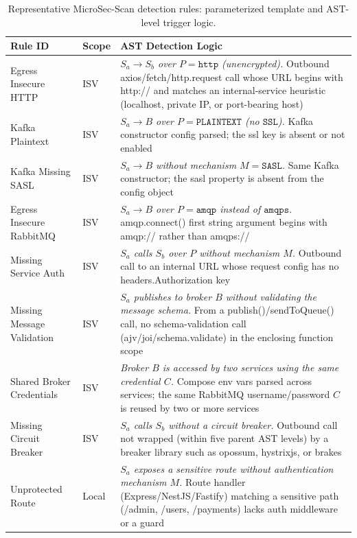 \documentclass[preprint,12pt]{elsarticle}
\begin{document}
\begin{table}[!t]
\centering
\caption{Representative MicroSec-Scan detection rules: parameterized template and AST-level trigger logic.}
\label{tab:rule_examples}
\setlength{\tabcolsep}{4pt}
\renewcommand{\arraystretch}{1.1}
\scriptsize
\begin{tabularx}{\linewidth}{@{} L{2.3cm} C{0.7cm} Y @{}}
\toprule
\textbf{Rule ID} & \textbf{Scope} & \textbf{AST Detection Logic} \\
\midrule
Egress Insecure HTTP & ISV &
\textit{$S_a \rightarrow S_b$ over $P=\mathtt{http}$ (unencrypted).} Outbound axios/fetch/http.request call whose URL begins with http:// and matches an internal-service heuristic (localhost, private IP, or port-bearing host) \\
\addlinespace[2pt]
Kafka Plaintext & ISV &
\textit{$S_a \rightarrow B$ over $P=\mathtt{PLAINTEXT}$ (no $\mathtt{SSL}$).} Kafka constructor config parsed; the ssl key is absent or not enabled \\
\addlinespace[2pt]
Kafka Missing SASL & ISV &
\textit{$S_a \rightarrow B$ without mechanism $M=\mathtt{SASL}$.} Same Kafka constructor; the sasl property is absent from the config object \\
\addlinespace[2pt]
Egress Insecure RabbitMQ & ISV &
\textit{$S_a \rightarrow B$ over $P=\mathtt{amqp}$ instead of $\mathtt{amqps}$.} amqp.connect() first string argument begins with amqp:// rather than amqps:// \\
\addlinespace[2pt]
Missing Service Auth & ISV &
\textit{$S_a$ calls $S_b$ over $P$ without mechanism $M$.} Outbound call to an internal URL whose request config has no headers.Authorization key \\
\addlinespace[2pt]
Missing Message Validation & ISV &
\textit{$S_a$ publishes to broker $B$ without validating the message schema.} From a publish()/sendToQueue() call, no schema-validation call (ajv/joi/schema.validate) in the enclosing function scope \\
\addlinespace[2pt]
Shared Broker Credentials & ISV &
\textit{Broker $B$ is accessed by two services using the same credential $C$.} Compose env vars parsed across services; the same RabbitMQ username/password $C$ is reused by two or more services \\
\addlinespace[2pt]
Missing Circuit Breaker & ISV &
\textit{$S_a$ calls $S_b$ without a circuit breaker.} Outbound call not wrapped (within five parent AST levels) by a breaker library such as opossum, hystrixjs, or brakes \\
\addlinespace[2pt]
Unprotected Route & Local &
\textit{$S_a$ exposes a sensitive route without authentication mechanism $M$.} Route handler (Express/NestJS/Fastify) matching a sensitive path (/admin, /users, /payments) lacks auth middleware or a guard \\
\bottomrule
\end{tabularx}
\end{table}
\end{document}
